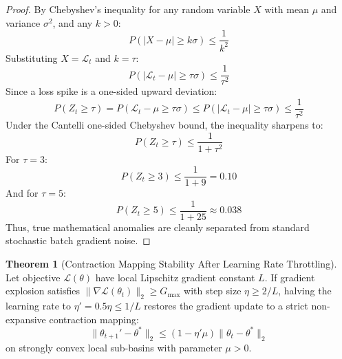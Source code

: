 \documentclass[11pt,a4paper]{article}
\theoremstyle{definition}
\newtheorem{theorem}{\textbf{Theorem}}[section]
\begin{document}
\begin{proof}
By Chebyshev's inequality for any random variable $X$ with mean $\mu$ and variance $\sigma^2$, and any $k > 0$:
{\boldmath
\begin{equation}
P\left( |X - \mu| \ge k \sigma \right) \le \frac{1}{k^2}
\end{equation}
}
Substituting $X = \mathcal{L}_t$ and $k = \tau$:
{\boldmath
\begin{equation}
P\left( |\mathcal{L}_t - \mu| \ge \tau \sigma \right) \le \frac{1}{\tau^2}
\end{equation}
}
Since a loss spike is a one-sided upward deviation:
{\boldmath
\begin{equation}
P\left( Z_t \ge \tau \right) = P\left( \mathcal{L}_t - \mu \ge \tau \sigma \right) \le P\left( |\mathcal{L}_t - \mu| \ge \tau \sigma \right) \le \frac{1}{\tau^2}
\end{equation}
}
Under the Cantelli one-sided Chebyshev bound, the inequality sharpens to:
{\boldmath
\begin{equation}
P\left( Z_t \ge \tau \right) \le \frac{1}{1 + \tau^2}
\end{equation}
}
For $\tau = 3$:
{\boldmath
\begin{equation}
P(Z_t \ge 3) \le \frac{1}{1 + 9} = 0.10
\end{equation}
}
And for $\tau = 5$:
{\boldmath
\begin{equation}
P(Z_t \ge 5) \le \frac{1}{1 + 25} \approx 0.038
\end{equation}
}
Thus, true mathematical anomalies are cleanly separated from standard stochastic batch gradient noise.
\end{proof}

\begin{theorem}[Contraction Mapping Stability After Learning Rate Throttling]
Let objective $\mathcal{L}(\theta)$ have local Lipschitz gradient constant $L$. If gradient explosion satisfies $\|\nabla \mathcal{L}(\theta_t)\|_2 \ge G_{\max}$ with step size $\eta \ge 2/L$, halving the learning rate to $\eta' = 0.5 \eta \le 1/L$ restores the gradient update to a strict non-expansive contraction mapping:
{\boldmath
\begin{equation}
\|\theta_{t+1}' - \theta^*\|_2 \le (1 - \eta' \mu) \|\theta_t - \theta^*\|_2
\end{equation}
}
on strongly convex local sub-basins with parameter $\mu > 0$.
\end{theorem}
\end{document}
